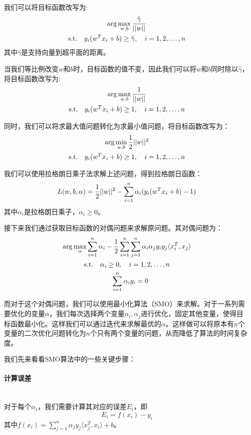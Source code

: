 \documentclass[a4paper]{article}
\begin{document}
我们可以将目标函数改写为:
\begin{gather}
    \arg\max_{w, b} \frac{\hat{\gamma}}{||w||} \notag \\
    \text{s.t.} \quad y_i(w^T x_i+b) \geq \hat{\gamma}, \quad i=1,2,\ldots,n \notag
\end{gather}
其中$\hat{\gamma}$是支持向量到超平面的距离。

当我们等比例改变$w$和$b$时，目标函数的值不变，因此我们可以将$w$和$b$同时除以$\hat{\gamma}$，将目标函数改写为:
\begin{gather}
    \arg\max_{w, b} \frac{1}{||w||} \notag \\
    \text{s.t.} \quad y_i(w^T x_i+b) \geq 1, \quad i=1,2,\ldots,n \notag
\end{gather}

同时，我们可以将求最大值问题转化为求最小值问题，将目标函数改写为：
\begin{gather}
    \arg\min_{w, b} \frac{1}{2}||w||^2 \notag \\
    \text{s.t.} \quad y_i(w^T x_i+b) \geq 1, \quad i=1,2,\ldots,n \notag
\end{gather}

我们可以使用拉格朗日乘子法求解上述问题，得到拉格朗日函数：
\begin{gather}
    L(w, b, \alpha) = \frac{1}{2}||w||^2 - \sum_{i=1}^{n}\alpha_i(y_i(w^T x_i+b)-1) \notag
\end{gather}
其中$\alpha_i$是拉格朗日乘子，$\alpha_i \geq 0$。

接下来我们通过获取目标函数的对偶问题来求解原问题。其对偶问题为：
\begin{gather}
    \arg\max_{\alpha} \sum_{i=1}^{n}\alpha_i - \frac{1}{2}\sum_{i=1}^{n}\sum_{j=1}^{n}\alpha_i\alpha_jy_iy_j\langle x_i^T, x_j\rangle  \notag \\
    \text{s.t.} \quad \alpha_i \geq 0, \quad i=1,2,\ldots,n \notag \\
    \quad \sum_{i=1}^{n}\alpha_iy_i = 0 \notag
\end{gather}

而对于这个对偶问题，我们可以使用最小化算法（SMO）\cite{smo}来求解。对于一系列需要优化的变量$\alpha$，我们每次选择两个变量$\alpha_i, \alpha_j$进行优化，固定其他变量，使得目标函数最小化。这样我们可以通过迭代来求解最优的$\alpha$。这样做可以将原本有$n$个变量的二次优化问题转化为$n$个只有两个变量的问题，从而降低了算法的时间复杂度。

我们先来看看SMO算法中的一些关键步骤：

\paragraph*{计算误差}
\ \\
对于每个$\alpha_i$，我们需要计算其对应的误差$E_i$，即
\[E_i = f(x_i) - y_i\]
其中$f(x_i) = \sum_{j=1}^{n}\alpha_jy_j\langle x_j^T, x_i\rangle + b$。
\end{document}
